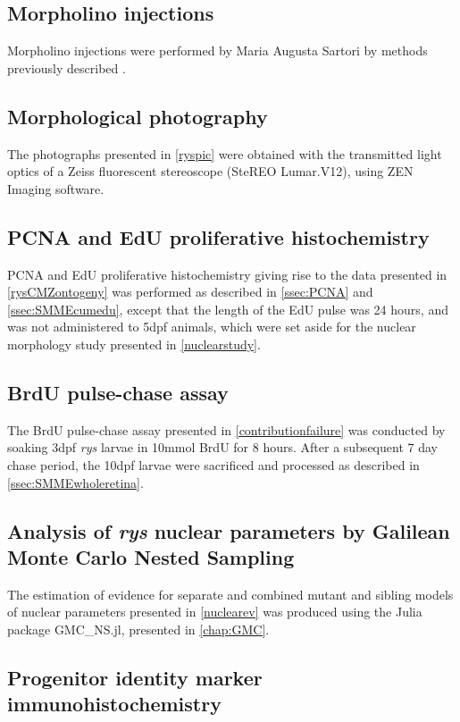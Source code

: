 \subsection{Morpholino injections}
Morpholino injections were performed by Maria Augusta Sartori by methods previously described \cite{Wong2015}.
 
\subsection{Morphological photography}
The photographs presented in \autoref{ryspic} were obtained with the transmitted light optics of a Zeiss fluorescent stereoscope (SteREO Lumar.V12), using ZEN Imaging software.

\subsection{PCNA and EdU proliferative histochemistry}
PCNA and EdU proliferative histochemistry giving rise to the data presented in \autoref{rysCMZontogeny} was performed as described in \autoref{ssec:PCNA} and \autoref{ssec:SMMEcumedu}, except that the length of the EdU pulse was 24 hours, and was not administered to 5dpf animals, which were set aside for the nuclear morphology study presented in \autoref{nuclearstudy}.

\subsection{BrdU pulse-chase assay}
The BrdU pulse-chase assay presented in \autoref{contributionfailure} was conducted by soaking 3dpf \textit{rys} larvae in 10\si{\milli\mole} BrdU for 8 hours. After a subsequent 7 day chase period, the 10dpf larvae were sacrificed and processed as described in \autoref{ssec:SMMEwholeretina}.

\subsection{Analysis of \textit{rys} nuclear parameters by Galilean Monte Carlo Nested Sampling}
The estimation of evidence for separate and combined mutant and sibling models of nuclear parameters presented in \autoref{nuclearev} was produced using the Julia package GMC\_NS.jl, presented in \autoref{chap:GMC}. 

\subsection{Progenitor identity marker immunohistochemistry}


